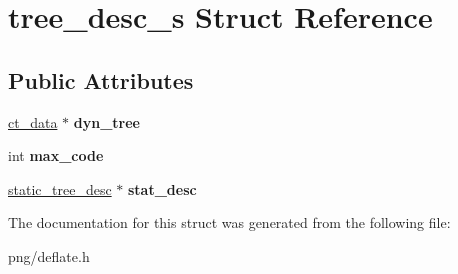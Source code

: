 \hypertarget{structtree__desc__s}{}\section{tree\+\_\+desc\+\_\+s Struct Reference}
\label{structtree__desc__s}
\subsection*{Public Attributes}
\begin{DoxyCompactItemize}
\item 
\hyperlink{structct__data__s}{ct\+\_\+data} $\ast$ {\bfseries dyn\+\_\+tree}\hypertarget{structtree__desc__s_a5c79989c018b96c729e88e41f98a4920}{}\label{structtree__desc__s_a5c79989c018b96c729e88e41f98a4920}

\item 
int {\bfseries max\+\_\+code}\hypertarget{structtree__desc__s_a11f42f2c0464693def462dcfdd871002}{}\label{structtree__desc__s_a11f42f2c0464693def462dcfdd871002}

\item 
\hyperlink{structstatic__tree__desc__s}{static\+\_\+tree\+\_\+desc} $\ast$ {\bfseries stat\+\_\+desc}\hypertarget{structtree__desc__s_a7f237428776ee85058bb7f7f11900dd2}{}\label{structtree__desc__s_a7f237428776ee85058bb7f7f11900dd2}

\end{DoxyCompactItemize}


The documentation for this struct was generated from the following file\+:\begin{DoxyCompactItemize}
\item 
png/deflate.\+h\end{DoxyCompactItemize}
